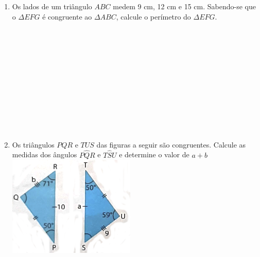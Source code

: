 \documentclass[a4paper,14pt]{article}
\begin{document}
\begin{multicols}{2}
\begin{enumerate}
			\item Os lados de um triângulo $ABC$ medem 9 cm, 12 cm e 15 cm. Sabendo-se que o $\Delta$$EFG$ é congruente ao $\Delta$$ABC$, calcule o perímetro do $\Delta$$EFG$. 
			\\\\\\\\\\\\\\\\\\\\\\\\
			\item Os triângulos $PQR$ e $TUS$ das figuras a seguir são congruentes. Calcule as medidas dos ângulos $P\hat{Q}R$ e $T\hat{S}U$ e determine o valor de $a + b$ \\
			\includegraphics[width=1\linewidth]{6FMA108_imagens/imagem6}
		\end{enumerate}
		$~$ \\ 	$~$ \\ 	$~$ \\ 	$~$ \\ 	$~$ \\ 	$~$ \\ 	$~$ \\ 	$~$ \\ 	$~$
	\end{multicols}
\end{document}
